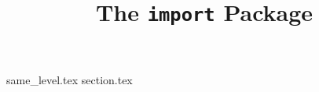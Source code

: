 \documentclass{article}
\title{\bf The \texttt{import} Package}
\date{}
\begin{document}
	\maketitle
	
	{same_level.tex}
	{section.tex}
\end{document}
